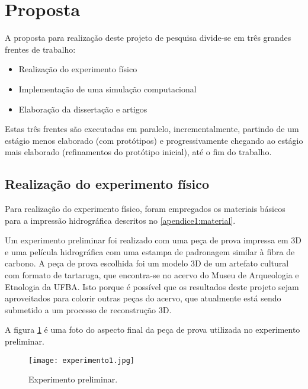 
\acresetall

\section{Proposta}

A proposta para realização deste projeto de pesquisa divide-se em três grandes frentes de trabalho:

\begin{itemize}
\item Realização do experimento físico
\item Implementação de uma simulação computacional 
\item Elaboração da dissertação e artigos
\end{itemize}

Estas três frentes são executadas em paralelo, incrementalmente, partindo de um estágio menos elaborado (com protótipos) e progressivamente chegando ao estágio mais elaborado (refinamentos do protótipo inicial), até o fim do trabalho.

\subsection{Realização do experimento físico}

Para realização do experimento físico, foram empregados os materiais básicos para a impressão hidrográfica descritos no \ref{apendice1:material}.

Um experimento preliminar foi realizado com uma peça de prova impressa em 3D e uma película hidrográfica com uma estampa de padronagem similar à fibra de carbono. A peça de prova escolhida foi um modelo 3D de um artefato cultural com formato de tartaruga, que encontra-se no acervo do Museu de Arqueologia e Etnologia da UFBA. Isto porque é possível que os resultados deste projeto sejam aproveitados para colorir outras peças do acervo, que atualmente está sendo submetido a um processo de reconstrução 3D.

A figura \ref{fig:experimento1} é uma foto do aspecto final da peça de prova utilizada no experimento preliminar.

\begin{figure}
\begin{center} 
\texttt{[image: experimento1.jpg]}
\caption{Experimento preliminar.}
\label{fig:experimento1}
\end{center} 
\end{figure}

